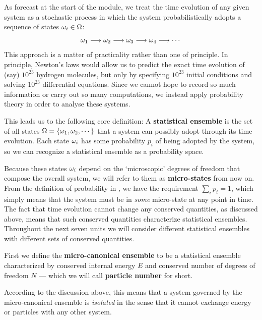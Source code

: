 As forecast at the start of the module, we treat the time evolution of any given system as a stochastic process in which the system probabilistically adopts a sequence of states $\omega_i \in \Omega$:
\begin{equation*}
  \omega_1 \longrightarrow \omega_2 \longrightarrow \omega_3 \longrightarrow \omega_4 \longrightarrow \cdots
\end{equation*}
This approach is a matter of practicality rather than one of principle.
In principle, Newton's laws would allow us to predict the exact time evolution of (say) $10^{23}$ hydrogen molecules, but only by specifying $10^{23}$ initial conditions and solving $10^{23}$ differential equations.
Since we cannot hope to record so much information or carry out so many computations, we instead apply probability theory in order to analyse these systems.

\begin{shaded}
  This leads us to the following core definition: A \textbf{statistical ensemble} is the set of all states $\Omega = \left\{\omega_1, \omega_2, \cdots\right\}$ that a system can possibly adopt through its time evolution.
  Each state $\omega_i$ has some probability $p_i$ of being adopted by the system, so we can recognize a statistical ensemble as a probability space. %
\end{shaded}

Because these states $\omega_i$ depend on the `microscopic' degrees of freedom that compose the overall system, we will refer to them as \textbf{micro-states} from now on.
From the definition of probability in , we have the requirement $\sum_i p_i = 1$, which simply means that the system must be in \textit{some} micro-state at any point in time.
The fact that time evolution cannot change any conserved quantities, as discussed above, means that such conserved quantities characterize statistical ensembles.
Throughout the next seven units we will consider different statistical ensembles with different sets of conserved quantities.

\begin{shaded}
  First we define the \textbf{micro-canonical ensemble} to be a statistical ensemble characterized by conserved internal energy $E$ and conserved number of degrees of freedom $N$ --- which we will call \textbf{particle number} for short.
\end{shaded}

According to the discussion above, this means that a system governed by the micro-canonical ensemble is \textit{isolated} in the sense that it cannot exchange energy or particles with any other system.

